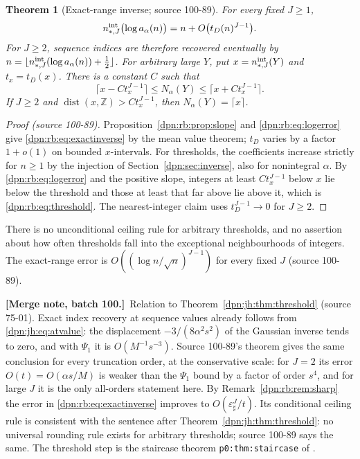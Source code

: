 \documentclass[11pt]{article}
\numberwithin{equation}{section}
\newtheorem{theorem}{Theorem}[section]
\theoremstyle{definition}\newtheorem{definition}[theorem]{Definition}
\theoremstyle{remark}\newtheorem{remark}[theorem]{Remark}
\newcommand{\src}[1]{\textup{(source #1)}}
\newcommand{\epsh}{\varepsilon_{\sharp}}
\newcommand{\mergenoted}[1]{\par\smallskip\noindent\textbf{[Merge note, batch 100.]}\ #1\par\smallskip}
\begin{document}
\begin{theorem}[Exact-range inverse; source 100-89]\label{dpn:rb:thm:inverse}
For every fixed $J\ge1$,
\begin{equation}\label{dpn:rb:eq:exactinverse}
 n^{\rm int}_{*,J}\bigl(\log a_\alpha(n)\bigr)=n+O\bigl(t_D(n)^{J-1}\bigr).
\end{equation}
For $J\ge2$, sequence indices are therefore recovered eventually by
$n=\lfloor n^{\rm int}_{*,J}(\log a_\alpha(n))+\frac12\rfloor$.  For arbitrary
large $Y$, put $x=n^{\rm int}_{*,J}(Y)$ and $t_x=t_D(x)$.  There is a
constant $C$ such that
\begin{equation}\label{dpn:rb:eq:threshold}
 \bigl\lceil x-Ct_x^{J-1}\bigr\rceil\le N_\alpha(Y)\le\bigl\lceil x+Ct_x^{J-1}\bigr\rceil.
\end{equation}
If $J\ge2$ and $\operatorname{dist}(x,\mathbb Z)>Ct_x^{J-1}$, then
$N_\alpha(Y)=\lceil x\rceil$.
\end{theorem}
\begin{proof}[Proof \src{100-89}]
Proposition~\ref{dpn:rb:prop:slope} and \eqref{dpn:rb:eq:logerror} give
\eqref{dpn:rb:eq:exactinverse} by the mean value theorem; $t_D$ varies by a
factor $1+o(1)$ on bounded $x$-intervals.  For thresholds, the coefficients
increase strictly for $n\ge1$ by the injection of
Section~\ref{dpn:sec:inverse}, also for nonintegral $\alpha$.  By
\eqref{dpn:rb:eq:logerror} and the positive slope, integers at least $Ct_x^{J-1}$
below $x$ lie below the threshold and those at least that far above lie
above it, which is \eqref{dpn:rb:eq:threshold}.  The nearest-integer claim uses
$t_D^{J-1}\to0$ for $J\ge2$.
\end{proof}
There is no unconditional ceiling rule for arbitrary thresholds, and no
assertion about how often thresholds fall into the exceptional
neighbourhoods of integers.  The exact-range error is
$O((\log n/\sqrt n)^{J-1})$ for every fixed $J$ \src{100-89}.

\mergenoted{Relation to Theorem~\ref{dpn:jh:thm:threshold} \src{75-01}.  Exact
index recovery at sequence values already follows from
\eqref{dpn:jh:eq:atvalue}: the displacement $-3/(8\alpha^2s^2)$ of the
Gaussian inverse tends to zero, and with $\Psi_1$ it is
$O(M^{-1}s^{-3})$.  Source 100-89's theorem gives the same conclusion for
every truncation order, at the conservative scale: for $J=2$ its error
$O(t)=O(\alpha s/M)$ is weaker than the $\Psi_1$ bound by a factor of order
$s^4$, and for large $J$ it is the only all-orders statement here.  By
Remark~\ref{dpn:rb:rem:sharp} the error in \eqref{dpn:rb:eq:exactinverse}
improves to $O(\epsh^J/t)$.  Its conditional ceiling rule is consistent with
the sentence after Theorem~\ref{dpn:jh:thm:threshold}: no universal rounding
rule exists for arbitrary thresholds; source 100-89 says the same.  The
threshold step is the staircase theorem \texttt{p0:thm:staircase} of
\cite{tai}.}
\end{document}

